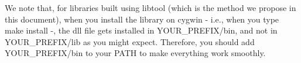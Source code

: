 We note that, for libraries built using libtool (which is the 
method we propose in this document), when you install the 
library on cygwin - i.e., when you type make install -, the dll 
file gets installed in YOUR\_PREFIX/bin, and not in YOUR\_PREFIX/lib as 
you might expect. Therefore, you should add YOUR\_PREFIX/bin to your 
PATH to make everything work smoothly. 

